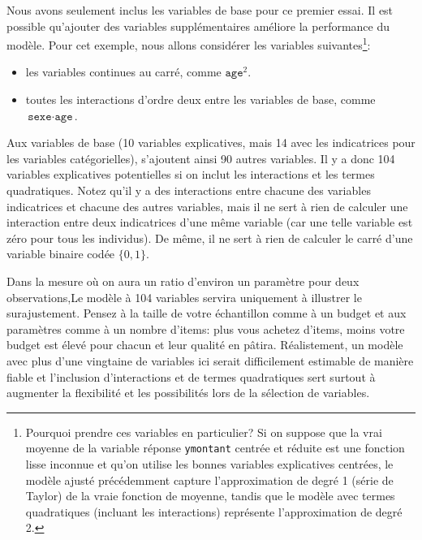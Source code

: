 \documentclass[
  11pt,
  letterpaper,
]{scrbook}
\providecommand{\tightlist}{%
  \setlength{\itemsep}{0pt}\setlength{\parskip}{0pt}}\usepackage{longtable,booktabs,array}
\theoremstyle{definition}
\theoremstyle{remark}
\begin{document}
Nous avons seulement inclus les variables de base pour ce premier essai.
Il est possible qu'ajouter des variables supplémentaires améliore la
performance du modèle. Pour cet exemple, nous allons considérer les
variables suivantes\footnote{Pourquoi prendre ces variables en
  particulier? Si on suppose que la vrai moyenne de la variable réponse
  \texttt{ymontant} centrée et réduite est une fonction lisse inconnue
  et qu'on utilise les bonnes variables explicatives centrées, le modèle
  ajusté précédemment capture l'approximation de degré 1 (série de
  Taylor) de la vraie fonction de moyenne, tandis que le modèle avec
  termes quadratiques (incluant les interactions) représente
  l'approximation de degré 2.}:

\begin{itemize}
\tightlist
\item
  les variables continues au carré, comme \(\texttt{age}^2\).
\item
  toutes les interactions d'ordre deux entre les variables de base,
  comme \(\texttt{sexe}\cdot\texttt{age}\).
\end{itemize}

Aux variables de base (10 variables explicatives, mais 14 avec les
indicatrices pour les variables catégorielles), s'ajoutent ainsi 90
autres variables. Il y a donc 104 variables explicatives potentielles si
on inclut les interactions et les termes quadratiques. Notez qu'il y a
des interactions entre chacune des variables indicatrices et chacune des
autres variables, mais il ne sert à rien de calculer une interaction
entre deux indicatrices d'une même variable (car une telle variable est
zéro pour tous les individus). De même, il ne sert à rien de calculer le
carré d'une variable binaire codée \(\{0, 1\}\).

Dans la mesure où on aura un ratio d'environ un paramètre pour deux
observations,Le modèle à 104 variables servira uniquement à illustrer le
surajustement. Pensez à la taille de votre échantillon comme à un budget
et aux paramètres comme à un nombre d'items: plus vous achetez d'items,
moins votre budget est élevé pour chacun et leur qualité en pâtira.
Réalistement, un modèle avec plus d'une vingtaine de variables ici
serait difficilement estimable de manière fiable et l'inclusion
d'interactions et de termes quadratiques sert surtout à augmenter la
flexibilité et les possibilités lors de la sélection de variables.
\end{document}
